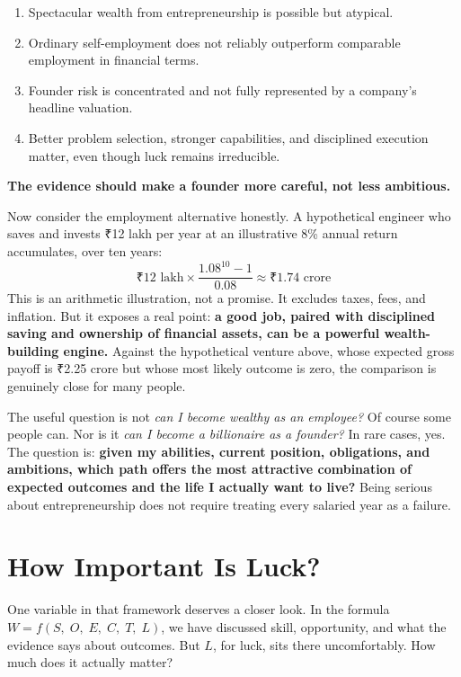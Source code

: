 \begin{enumerate}
  \item Spectacular wealth from entrepreneurship is possible but atypical.
  \item Ordinary self-employment does not reliably outperform comparable employment in financial terms.
  \item Founder risk is concentrated and not fully represented by a company's headline valuation.
  \item Better problem selection, stronger capabilities, and disciplined execution matter, even though luck remains irreducible.
\end{enumerate}

\textbf{The evidence should make a founder more careful, not less ambitious.}

Now consider the employment alternative honestly. A hypothetical engineer who saves and invests \mbox{₹}12 lakh per year at an illustrative 8\% annual return accumulates, over ten years:
\[\mbox{₹}12\text{ lakh} \times \frac{1.08^{10}-1}{0.08} \approx \mbox{₹}1.74\text{ crore}\]
This is an arithmetic illustration, not a promise. It excludes taxes, fees, and inflation. But it exposes a real point: \textbf{a good job, paired with disciplined saving and ownership of financial assets, can be a powerful wealth-building engine.} Against the hypothetical venture above, whose expected gross payoff is \mbox{₹}2.25 crore but whose most likely outcome is zero, the comparison is genuinely close for many people.

The useful question is not \emph{can I become wealthy as an employee?} Of course some people can. Nor is it \emph{can I become a billionaire as a founder?} In rare cases, yes. The question is: \textbf{given my abilities, current position, obligations, and ambitions, which path offers the most attractive combination of expected outcomes and the life I actually want to live?} Being serious about entrepreneurship does not require treating every salaried year as a failure.

\section{How Important Is Luck?}
\label{sec:ch01-luck-and-wealth}

One variable in that framework deserves a closer look. In the formula $W = f(S,\; O,\; E,\; C,\; T,\; L)$, we have discussed skill, opportunity, and what the evidence says about outcomes. But $L$, for luck, sits there uncomfortably. How much does it actually matter?

